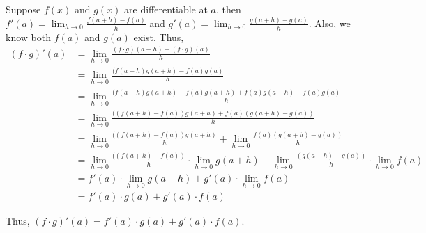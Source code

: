 \documentclass[a4paper,12pt]{report}
\begin{document}
\noindent
Suppose $f(x)$ and $g(x)$ are differentiable at $a$, then $f'(a)=\displaystyle{\lim_{h\to 0}}\frac{f(a+h)-f(a)}{h}$ and $g'(a)=\displaystyle{\lim_{h\to 0}}\frac{g(a+h)-g(a)}{h}$. Also, we know both $f(a)$ and $g(a)$ exist. 
Thus, 
\begin{align*}
(f\cdot{g})'(a) &= \displaystyle{\lim_{h\to 0}}\frac{(f\cdot{g})(a+h)-(f\cdot{g})(a)}{h}\\
&= \displaystyle{\lim_{h\to 0}}\frac{(f(a+h)g(a+h)-f(a)g(a)}{h}\\
&= \displaystyle{\lim_{h\to 0}}\frac{(f(a+h)g(a+h)-f(a)g(a+h)+f(a)g(a+h)-f(a)g(a)}{h}\\
&= \displaystyle{\lim_{h\to 0}}\frac{((f(a+h)-f(a))g(a+h)+f(a)(g(a+h)-g(a))}{h}\\
&= \displaystyle{\lim_{h\to 0}}\frac{((f(a+h)-f(a))g(a+h)}{h}+\displaystyle{\lim_{h\to 0}}\frac{f(a)(g(a+h)-g(a))}{h}\\
&= \displaystyle{\lim_{h\to 0}}\frac{((f(a+h)-f(a))}{h}\cdot{\displaystyle{\lim_{h\to 0}}g(a+h)}+\displaystyle{\lim_{h\to 0}}\frac{(g(a+h)-g(a))}{h}\cdot{\displaystyle{\lim_{h\to 0}}f(a)}\\
&= f'(a)\cdot{\displaystyle{\lim_{h\to 0}}g(a+h)}+g'(a)\cdot{\displaystyle{\lim_{h\to 0}}f(a)}\\
&= f'(a)\cdot{g(a)}+g'(a)\cdot{f(a)}
\end{align*}

\noindent
Thus, $(f\cdot{g})'(a) = f'(a)\cdot{g(a)}+g'(a)\cdot{f(a)}$.
\end{document}
